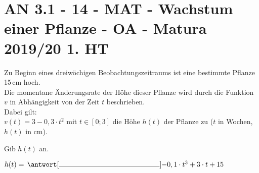 \section{AN 3.1 - 14 - MAT - Wachstum einer Pflanze - OA - Matura 2019/20 1. HT}

\begin{beispiel}[AN 3.1]{1}
Zu Beginn eines dreiwöchigen Beobachtungszeitraums ist eine bestimmte Pflanze 15\,cm hoch.\\
Die momentane Änderungsrate der Höhe dieser Pflanze wird durch die Funktion $v$ in Abhängigkeit von der Zeit $t$ beschrieben.\\
Dabei gilt:\\
$v(t)=3-0,3\cdot t^2$ mit $t\in[0;3]$ die Höhe $h(t)$ der Pflanze zu ($t$ in Wochen, $h(t)$ in cm).

Gib $h(t)$ an.\leer

$h(t)=\,\antwort[\rule{5cm}{0.3pt}]{-0,1\cdot t^3+3\cdot t+15}$
\end{beispiel}